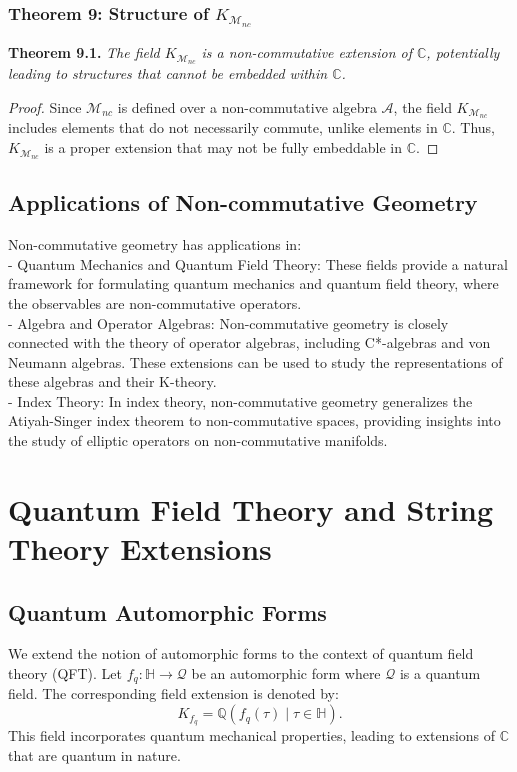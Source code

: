 \documentclass{article}
\begin{document}
\subsubsection{Theorem 9: Structure of \(K_{\mathcal{M}_{nc}}\)}
\textbf{Theorem 9.1.} \textit{The field \(K_{\mathcal{M}_{nc}}\) is a non-commutative extension of \(\mathbb{C}\), potentially leading to structures that cannot be embedded within \(\mathbb{C}\).}

\begin{proof}
Since \(\mathcal{M}_{nc}\) is defined over a non-commutative algebra \(\mathcal{A}\), the field \(K_{\mathcal{M}_{nc}}\) includes elements that do not necessarily commute, unlike elements in \(\mathbb{C}\). Thus, \(K_{\mathcal{M}_{nc}}\) is a proper extension that may not be fully embeddable in \(\mathbb{C}\).
\end{proof}

\subsection{Applications of Non-commutative Geometry}
Non-commutative geometry has applications in:
{\ }\\
- Quantum Mechanics and Quantum Field Theory: These fields provide a natural framework for formulating quantum mechanics and quantum field theory, where the observables are non-commutative operators.
{\ }\\
- Algebra and Operator Algebras: Non-commutative geometry is closely connected with the theory of operator algebras, including C*-algebras and von Neumann algebras. These extensions can be used to study the representations of these algebras and their K-theory.
{\ }\\
- Index Theory: In index theory, non-commutative geometry generalizes the Atiyah-Singer index theorem to non-commutative spaces, providing insights into the study of elliptic operators on non-commutative manifolds.

\section{Quantum Field Theory and String Theory Extensions}
\subsection{Quantum Automorphic Forms}
We extend the notion of automorphic forms to the context of quantum field theory (QFT). Let \(f_q: \mathbb{H} \to \mathcal{Q}\) be an automorphic form where \(\mathcal{Q}\) is a quantum field. The corresponding field extension is denoted by:
\[
K_{f_q} = \mathbb{Q}(f_q(\tau) \mid \tau \in \mathbb{H}).
\]
This field incorporates quantum mechanical properties, leading to extensions of \(\mathbb{C}\) that are quantum in nature.
\end{document}
